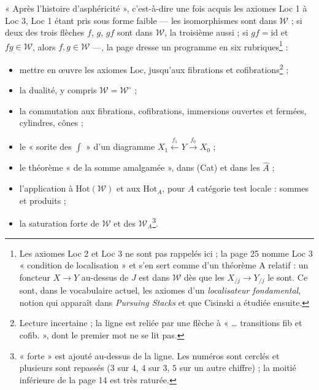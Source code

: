 \documentclass[11pt,a4paper]{article}
\begin{document}
« Après l'histoire d'asphéricité », c'est-à-dire une fois acquis les axiomes
Loc 1 à Loc 3, Loc 1 étant pris sous forme faible --- les isomorphismes sont
dans $\mathcal{W}$ ; si deux des trois flèches $f$, $g$, $gf$ sont dans
$\mathcal{W}$, la troisième aussi ; si $gf = \mathrm{id}$ et $fg \in
\mathcal{W}$, alors $f, g \in \mathcal{W}$ ---, la page dresse un programme en
six rubriques\footnote{Les axiomes Loc 2 et Loc 3 ne sont pas rappelés ici ;
la page 25 nomme Loc 3 « condition de localisation » et s'en sert comme d'un
théorème A relatif : un foncteur $X \to Y$ au-dessus de $J$ est dans
$\mathcal{W}$ dès que les $X_{/j} \to Y_{/j}$ le sont. Ce sont, dans le
vocabulaire actuel, les axiomes d'un \emph{localisateur fondamental}, notion
qui apparaît dans \emph{Pursuing Stacks} et que Cisinski a étudiée ensuite.} :
\begin{itemize}
\item[(0)] mettre en œuvre les axiomes Loc, jusqu'aux fibrations et
cofibrations\footnote{Lecture incertaine ; la ligne est reliée par une flèche
à « … transitions fib et cofib. », dont le premier mot ne se lit pas.} ;
\item[(1)] la dualité, y compris $\mathcal{W} = \mathcal{W}^{\circ}$ ;
\item[(2)] la commutation aux fibrations, cofibrations, immersions ouvertes et
fermées, cylindres, cônes ;
\item[(3)] le « sorite des $\int$ » d'un diagramme $X_{1} \xleftarrow{f_{1}} Y
\xrightarrow{f_{0}} X_{0}$ ;
\item[(4)] le théorème « de la somme amalgamée », dans (Cat) et dans les
$\widehat{A}$ ;
\item[(5)] l'application à $\mathrm{Hot}(\mathcal{W})$ et aux
$\mathrm{Hot}_{A}$, pour $A$ catégorie test locale : sommes et produits ;
\item[(6)] la saturation forte de $\mathcal{W}$ et des
$\mathcal{W}_{A}$\footnote{« forte » est ajouté au-dessus de la ligne. Les
numéros sont cerclés et plusieurs sont repassés ($3$ sur $4$, $4$ sur $3$,
$5$ sur un autre chiffre) ; la moitié inférieure de la page 14 est très
raturée.}.
\end{itemize}
\end{document}
